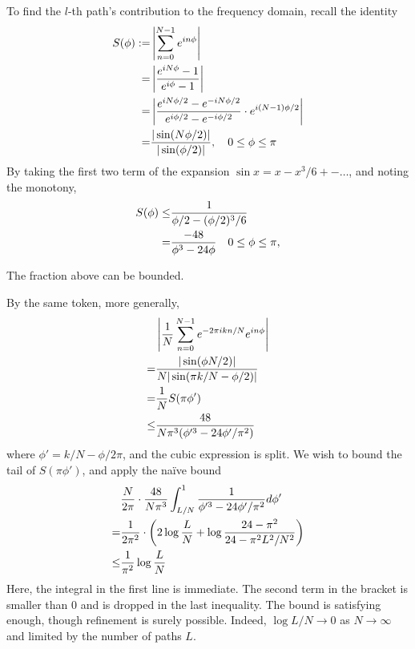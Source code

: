 \documentclass[12pt]{article}
\begin{document}
To find the \(l\)-th path's contribution to the frequency domain, recall the identity
\begin{align}
S(\phi)
:=&\left| \sum_{n=0}^{N-1} e^{i n \phi} \right| \\ \notag
=&\left| \frac{e^{i N \phi} -1}{e^{i \phi} -1} \right| \\ \notag
=&\left| \frac{e^{i N \phi/2} -e^{-i N \phi/2}}{e^{i \phi /2} -e^{-i \phi /2}} \cdot e^{i (N-1) \phi/2} \right| \\ \notag
=&\frac{|\sin(N \phi/2)|}{|\sin(\phi /2)|},
\quad 0 \leq \phi \leq \pi
\end{align}
By taking the first two term of the expansion \(\sin x =x -x^3/6 +- \dotsc\), and noting the monotony, 
\begin{align}
S(\phi)
\leq& \frac{1}{\phi/2 -(\phi/2)^3/6} \\ \notag
=& \frac{-48}{\phi^3 -24\phi}
\quad 0 \leq \phi \leq \pi,
\end{align}

The fraction above can be bounded.

By the same token, more generally,
\begin{align}
&\left| \frac{1}{N} \sum_{n=0}^{N-1} e^{-2\pi i k n/N} e^{i n \phi} \right| \\ \notag
=&\frac{|\sin( \phi N /2 )|}{N |\sin( \pi k /N -\phi /2 )|} \\ \notag
=&\frac{1}{N} S(\pi \phi') \\ \notag
\leq& \frac{48}{N \pi^3 (\phi'^3 -24 \phi' /\pi^2)}
\end{align}
where \(\phi' =k/N -\phi/2\pi\), and the cubic expression is split.
We wish to bound the tail of \(S(\pi \phi')\), and apply the na\"ive bound
\begin{align}
&\frac{N}{2\pi} \cdot \frac{48}{N \pi^3} \int_{L/N}^1 \frac{1}{\phi'^3 -24 \phi' /\pi^2}
 d\phi' \\ \notag
=&\frac{1}{2\pi^2} \cdot \left( 2 \log \frac{L}{N} +\log \frac{24-\pi^2}{24-\pi^2 L^2 /N^2} \right) \\ \notag
\leq& \frac{1}{\pi^2} \log \frac{L}{N}
\end{align}
Here, the integral in the first line is immediate.
The second term in the bracket is smaller than 0 and is dropped in the last inequality.
The bound is satisfying enough, though refinement is surely possible.
Indeed, \(\log L/N \to 0\) as \(N \to \infty\) and limited by the number of paths \(L\).

\end{document}
